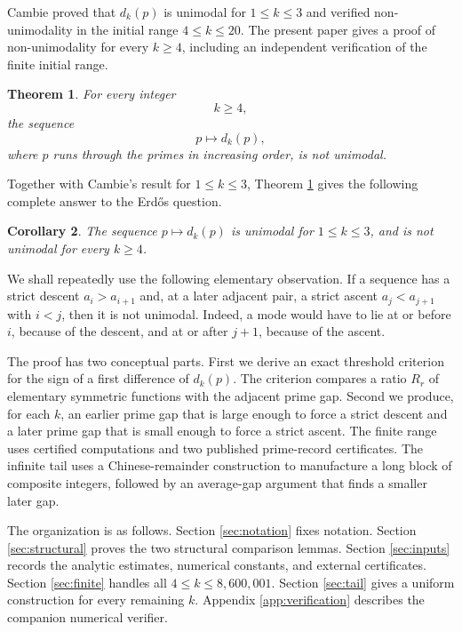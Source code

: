 \documentclass[11pt]{article}
\numberwithin{equation}{section}
\theoremstyle{plain}
\newtheorem{theorem}{Theorem}[section]
\newtheorem{corollary}[theorem]{Corollary}
\theoremstyle{definition}
\theoremstyle{remark}
\begin{document}
Cambie \cite{Cambie2025} proved that \(d_k(p)\) is unimodal for \(1\le k\le3\) and verified non-unimodality in the initial range \(4\le k\le20\).  The present paper gives a proof of non-unimodality for every \(k\ge4\), including an independent verification of the finite initial range.

\begin{theorem}\label{thm:main}
For every integer
\[
        k\ge 4,
\]
the sequence
\[
        p\longmapsto d_k(p),
\]
where \(p\) runs through the primes in increasing order, is not unimodal.
\end{theorem}

Together with Cambie's result for \(1\le k\le3\), Theorem \ref{thm:main} gives the following complete answer to the Erd\H{o}s question.

\begin{corollary}\label{cor:classification}
The sequence \(p\mapsto d_k(p)\) is unimodal for \(1\le k\le3\), and is not unimodal for every \(k\ge4\).
\end{corollary}

We shall repeatedly use the following elementary observation.  If a sequence has a strict descent \(a_i>a_{i+1}\) and, at a later adjacent pair, a strict ascent \(a_j<a_{j+1}\) with \(i<j\), then it is not unimodal.  Indeed, a mode would have to lie at or before \(i\), because of the descent, and at or after \(j+1\), because of the ascent.

The proof has two conceptual parts.  First we derive an exact threshold criterion for the sign of a first difference of \(d_k(p)\).  The criterion compares a ratio \(R_r\) of elementary symmetric functions with the adjacent prime gap.  Second we produce, for each \(k\), an earlier prime gap that is large enough to force a strict descent and a later prime gap that is small enough to force a strict ascent.  The finite range uses certified computations and two published prime-record certificates.  The infinite tail uses a Chinese-remainder construction to manufacture a long block of composite integers, followed by an average-gap argument that finds a smaller later gap.

The organization is as follows.  Section \ref{sec:notation} fixes notation.  Section \ref{sec:structural} proves the two structural comparison lemmas.  Section \ref{sec:inputs} records the analytic estimates, numerical constants, and external certificates.  Section \ref{sec:finite} handles all \(4\le k\le 8{,}600{,}001\).  Section \ref{sec:tail} gives a uniform construction for every remaining \(k\).  Appendix \ref{app:verification} describes the companion numerical verifier.
\end{document}

